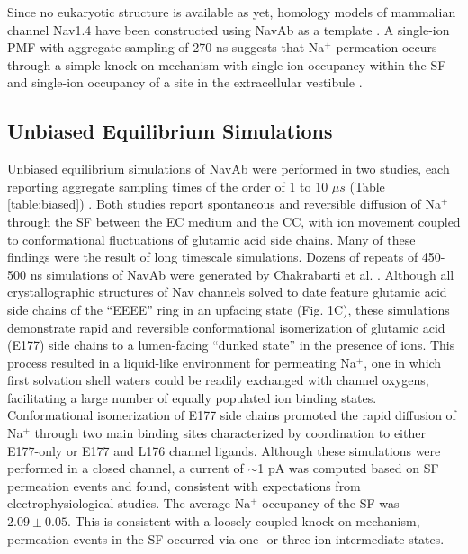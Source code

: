 \begin{refsection}
Since no eukaryotic structure is available as yet, homology models of mammalian channel Nav1.4 have been constructed using NavAb as a template \cite{Mahdavi:2015gs,Tikhonov:2012hq,Chen:2014uk,GosselinBadaroudine:2012va}.  A single-ion PMF with aggregate sampling of 270 ns suggests that Na$^{+}$ permeation occurs through a simple knock-on mechanism with single-ion occupancy within the SF and single-ion occupancy of a site in the extracellular vestibule \cite{Mahdavi:2015gs}. 
 
 \subsection{Unbiased Equilibrium Simulations}
 
 Unbiased equilibrium simulations of NavAb were performed in two studies, each reporting aggregate sampling times of the order of 1 to 10 $\mu s$ (Table \ref{table:biased}) \cite{Chakrabarti:2013kd,Boiteux:2014ut}.  Both studies report spontaneous and reversible diffusion of Na$^{+}$ through the SF between the EC medium and the CC, with ion movement coupled to conformational fluctuations of glutamic acid side chains.  Many of these findings were the result of long timescale simulations.
Dozens of repeats of 450-500 ns simulations of NavAb were generated by Chakrabarti et al. \cite{Chakrabarti:2013kd}.  Although all crystallographic structures of Nav channels solved to date feature glutamic acid side chains of the ``EEEE'' ring in an upfacing state (Fig. 1C), these simulations demonstrate rapid and reversible conformational isomerization of glutamic acid (E177) side chains to a lumen-facing ``dunked state'' in the presence of ions.  This process resulted in a liquid-like environment for permeating Na$^{+}$, one in which first solvation shell waters could be readily exchanged with channel oxygens, facilitating a large number of equally populated ion binding states. Conformational isomerization of E177 side chains promoted the rapid diffusion of Na$^{+}$ through two main binding sites characterized by coordination to either E177-only or E177 and L176 channel ligands.  Although these simulations were performed in a closed channel, a current of $\sim$1 pA was computed based on SF permeation events and found, consistent with expectations from electrophysiological studies.  The average Na$^{+}$ occupancy of the SF was $2.09 \pm 0.05$.  This is consistent with a loosely-coupled knock-on mechanism, permeation events in the SF occurred via one- or three-ion intermediate states. 

\end{refsection}
